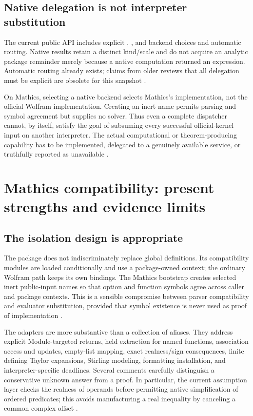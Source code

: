 \documentclass[11pt,a4paper]{article}
\newcommand{\code}[1]{\texttt{\detokenize{#1}}}
\theoremstyle{remark}
\begin{document}
\subsection{Native delegation is not interpreter substitution}

The current public API includes explicit \code{"Series"}, \code{"Asymptotic"}, and \code{"Package"} backend choices and automatic routing. Native results retain a distinct kind/scale and do not acquire an analytic package remainder merely because a native computation returned an expression. Automatic routing already exists; claims from older reviews that all delegation must be explicit are obsolete for this snapshot \cite{core,status}.

On Mathics, selecting a native backend selects Mathics's implementation, not the official Wolfram implementation. Creating an inert \code{System`} name permits parsing and symbol agreement but supplies no solver. Thus even a complete dispatcher cannot, by itself, satisfy the goal of subsuming every successful official-kernel input on another interpreter. The actual computational or theorem-producing capability has to be implemented, delegated to a genuinely available service, or truthfully reported as unavailable \cite{compatibility,mathicscompat}.

\section{Mathics compatibility: present strengths and evidence limits}
\subsection{The isolation design is appropriate}

The package does not indiscriminately replace global \code{System`} definitions. Its compatibility modules are loaded conditionally and use a package-owned context; the ordinary Wolfram path keeps its own bindings. The Mathics bootstrap creates selected inert public-input names so that option and function symbols agree across caller and package contexts. This is a sensible compromise between parser compatibility and evaluator substitution, provided that symbol existence is never used as proof of implementation \cite{mathicscompat,compatibility}.

The adapters are more substantive than a collection of aliases. They address explicit Module-targeted returns, held extraction for named functions, association access and updates, empty-list mapping, exact realness/sign consequences, finite defining Taylor expansions, Stirling modeling, formatting installation, and interpreter-specific deadlines. Several comments carefully distinguish a conservative unknown answer from a proof. In particular, the current assumption layer checks the realness of operands before permitting native simplification of ordered predicates; this avoids manufacturing a real inequality by canceling a common complex offset \cite{mathicscompat,mathicscalls,mathicslists,mathicsassumptions,mathicssimplification,mathicstaylor,mathicsspecial}.
\end{document}
